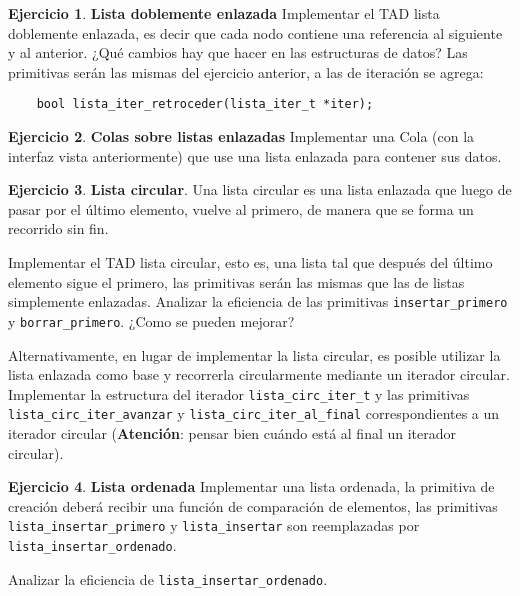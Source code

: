 \documentclass[11pt,a4paper]{article}
\theoremstyle{definition}
\newtheorem{ejercicio}{Ejercicio}[section]
\begin{document}
\begin{ejercicio}
\textbf{Lista doblemente enlazada} Implementar el TAD lista doblemente
enlazada, es decir que cada nodo contiene una referencia al siguiente y al
anterior. ¿Qué cambios hay que hacer en las estructuras de datos?
Las primitivas serán las mismas del ejercicio anterior, a las de
iteración se agrega:
\begin{lstlisting}
    bool lista_iter_retroceder(lista_iter_t *iter);
\end{lstlisting}
\end{ejercicio}

\begin{ejercicio}
\textbf{Colas sobre listas enlazadas}
Implementar una Cola (con la interfaz vista anteriormente) que use
una lista enlazada para contener sus datos.
\end{ejercicio}

\begin{ejercicio}
\textbf{Lista circular}.
Una lista circular es una lista enlazada que luego de pasar por el último
elemento, vuelve al primero, de manera que se forma un recorrido sin fin.

\begin{partes}
\item Implementar el TAD lista circular, esto es, una lista
tal que después del último elemento sigue el primero, las primitivas serán las
mismas que las de listas simplemente enlazadas.
Analizar la eficiencia de las primitivas \lstinline!insertar_primero! y
\lstinline!borrar_primero!. ¿Como se pueden mejorar?

\item Alternativamente, en lugar de implementar la lista circular, es
posible utilizar la lista enlazada como base y recorrerla circularmente
mediante un iterador circular. Implementar la estructura del iterador
\lstinline!lista_circ_iter_t! y las primitivas
\lstinline!lista_circ_iter_avanzar! y \lstinline!lista_circ_iter_al_final!
correspondientes a un iterador circular (\textbf{Atención}: pensar bien cuándo está
al final un iterador circular).
\end{partes}
\end{ejercicio}

\begin{ejercicio}
\textbf{Lista ordenada} Implementar una lista ordenada, la primitiva de
creación deberá recibir una función de comparación de elementos, las
primitivas \lstinline!lista_insertar_primero! y \lstinline!lista_insertar! son
reemplazadas por \lstinline!lista_insertar_ordenado!.
\begin{partes}
\item Analizar la eficiencia de \lstinline!lista_insertar_ordenado!.
\end{partes}
\end{ejercicio}
\end{document}
